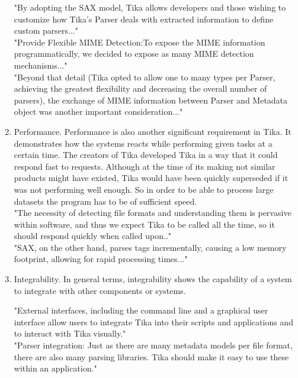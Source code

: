 \documentclass{article}
\begin{document}
\begin{enumerate}
    "By adopting the SAX model, Tika allows developers and those wishing to customize how Tika’s Parser deals with extracted information to define custom parsers..."\\
    
    "Provide Flexible MIME Detection:To expose the MIME information programmatically, we decided to expose as many MIME detection mechanisms..."\\
    
    "Beyond that detail (Tika opted to allow one to many types per Parser, achieving the greatest flexibility and decreasing the overall number of parsers), the exchange of MIME information between Parser and Metadata object was another important consideration..."\\
    \item Performance. Performance is also another significant requirement in Tika. It demonstrates how the systems reacts while performing given tasks at a certain time. The creators of Tika developed Tika in a way that it could respond fast to requests. Although at the time of its making not similar products might have existed, Tika would have been quickly superseded if it was not performing well enough. So in order to be able to process large datasets the program has to be of sufficient speed.\\
    
    "The necessity of detecting file formats and understanding them is pervasive within software, and thus we expect Tika to be called all the time, so it should respond quickly when called upon.."\\
    
    "SAX, on the other hand, parses tags incrementally, causing a low memory footprint, allowing for rapid processing times..."\\
    
    \item Integrability. In general terms, integrability shows the capability of a system to integrate with other components or systems. 
    
    "External interfaces, including the command line and a graphical user interface allow users to integrate Tika into their scripts and applications and to interact with Tika visually."\\
    
    "Parser integration: Just as there are many metadata models per file format, there are also many parsing libraries. Tika should make it easy to use these within an application."\\
    
\end{enumerate}
\end{document}
